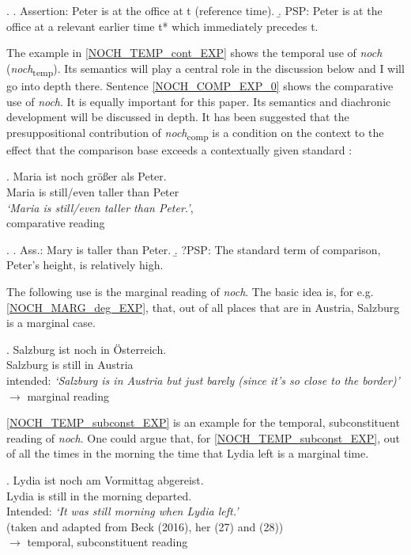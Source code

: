 \documentclass[output=paper,
modfonts
]{langscibook}
\begin{document}
\ex. \a. Assertion: Peter is at the office at t (reference time).
\b. PSP: Peter is at the office at a relevant earlier time t* which immediately precedes t.

The example in \ref{NOCH_TEMP_cont_EXP} shows the temporal use of \textit{noch} (\textit{noch}\textsubscript{temp}). Its semantics will play a central role in the discussion below and I will go into depth there. Sentence \ref{NOCH_COMP_EXP_0} shows the comparative use of \textit{noch}. It is equally important for this paper. Its semantics and diachronic development will be discussed in depth. It has been suggested that the presuppositional contribution of \textit{noch}\textsubscript{comp} is a condition on the context to the effect that the comparison base exceeds a contextually given standard \citep[e.g.][]{Hofstetter2013}:

\exg. Maria ist noch größer als Peter.\\
Maria is still/even taller than Peter\\
\textit{`Maria is still/even taller than Peter.'}, \\ \hfill comparative reading \label{NOCH_COMP_EXP_0}

\ex. \a. Ass.: Mary is taller than Peter.
\b. ?PSP: The standard term of comparison, Peter's height, is relatively high.

The following use is the marginal reading of \textit{noch}. The basic idea is, for e.g. \ref{NOCH_MARG_deg_EXP}, that, out of all places that are in Austria, Salzburg is a marginal case.

\exg. Salzburg ist noch in Österreich.\\
Salzburg is still in Austria \\
intended: \textit{`Salzburg is in Austria but just barely (since it's so close to the border)'} \\ \hfill $\rightarrow$ marginal reading \label{NOCH_MARG_deg_EXP}

\ref{NOCH_TEMP_subconst_EXP} is an example for the temporal, subconstituent reading of \textit{noch}. One could argue that, for \ref{NOCH_TEMP_subconst_EXP}, out of all the times in the morning the time that Lydia left is a marginal time.

\exg. Lydia ist noch am Vormittag abgereist.\\
Lydia is still {in the} morning departed.\\
Intended: \textit{`It was still morning when Lydia left.'}\\ \hfill \small{(taken and adapted from Beck (2016), her (27) and (28))}\\ \normalsize \hfill $\rightarrow$ temporal, subconstituent reading \label{NOCH_TEMP_subconst_EXP}
\end{document}
